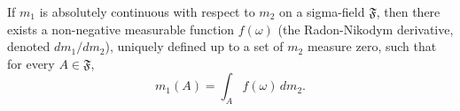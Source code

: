 If $m_1$ is absolutely continuous with respect to $m_2$ on a sigma-field $\mathfrak{F}$, then there exists a non-negative measurable function $f(\omega)$ (the Radon-Nikodym derivative, denoted $dm_1/dm_2$), uniquely defined up to a set of $m_2$ measure zero, such that for every $A \in \mathfrak{F}$,
$$m_1(A) = \int_A f(\omega) \, dm_2.$$
